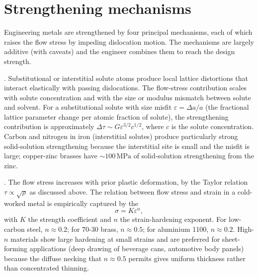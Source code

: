\section{Strengthening mechanisms}

Engineering metals are strengthened by four principal mechanisms,
each of which raises the flow stress by impeding dislocation motion.
The mechanisms are largely additive (with caveats) and the engineer
combines them to reach the design strength.

. Substitutional or interstitial
solute atoms produce local lattice distortions that interact
elastically with passing dislocations. The flow-stress contribution
scales with solute concentration and with the size or modulus
mismatch between solute and solvent. For a substitutional solute with
size misfit $\varepsilon = \Delta a/a$ (the fractional lattice
parameter change per atomic fraction of solute), the strengthening
contribution is approximately $\Delta \tau \sim G \varepsilon^{3/2}
c^{1/2}$, where $c$ is the solute concentration. Carbon and nitrogen
in iron (interstitial solutes) produce particularly strong
solid-solution strengthening because the interstitial site is small
and the misfit is large; copper-zinc brasses have $\sim 100\,\text{MPa}$
of solid-solution strengthening from the zinc.

. The flow stress increases
with prior plastic deformation, by the Taylor relation $\tau \propto
\sqrt{\rho}$ as discussed above. The relation between flow stress and
strain in a cold-worked metal is empirically captured by the
\[
\sigma = K \varepsilon^n,
\]
with $K$ the strength coefficient and $n$ the strain-hardening
exponent. For low-carbon steel, $n \approx 0.2$; for $70\text{-}30$
brass, $n \approx 0.5$; for aluminium 1100, $n \approx 0.2$.
High-$n$ materials show large hardening at small strains and are
preferred for sheet-forming applications (deep drawing of beverage
cans, automotive body panels) because the diffuse necking that
$n \approx 0.5$ permits gives uniform thickness rather than
concentrated thinning.

